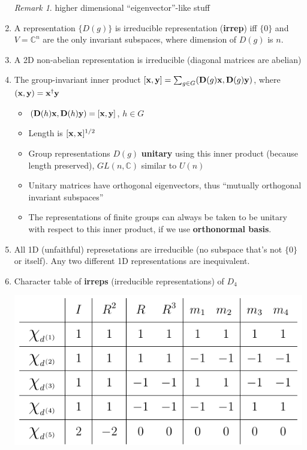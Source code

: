 \documentclass{article}
\theoremstyle{remark}
\newtheorem*{remark}{Remark}
\theoremstyle{remark}
\begin{document}
\begin{enumerate}
            \begin{remark}
                higher dimensional ``eigenvector''-like stuff
            \end{remark}
        \item A representation $\{D(g)\}$ is irreducible representation (\textbf{irrep}) iff $\{0\}$ and $V=\mathbb{C}^n$ are the only invariant subspaces, where dimension of $D(g)$ is $n$.
        \item A 2D non-abelian representation is irreducible (diagonal matrices are abelian)
        \item The group-invariant inner product $[\vb{x},\vb{y}]=\sum_{g\in G}(\vb{D}(g)\vb{x},\vb{D}(g)\vb{y})$, where $(\vb{x},\vb{y})=\vb{x}^\dagger\vb{y}$\begin{itemize}
                \item $(\vb{D}(h)\vb{x},\vb{D}(h)\vb{y})=[\vb{x},\vb{y}]$, $h\in G$
                \item Length is $[\vb{x},\vb{x}]^{1/2}$
                \item Group representations $D(g)$ \textbf{unitary} using this inner product (because length preserved), $GL(n,\mathbb{C})$ similar to $U(n)$
                \item Unitary matrices have orthogonal eigenvectors, thus ``mutually orthogonal invariant subspaces''
                \item The representations of finite groups can always be taken to be unitary with respect to this inner product, if we use \textbf{orthonormal basis}.
            \end{itemize}
        \item All 1D (unfaithful) represetations are irreducible (no subspace that's not $\{0\}$ or itself). Any two different 1D representations are inequivalent.
        \item Character table of \textbf{irreps} (irreducible representations) of $D_4$\\
            \begin{center}
                \includegraphics*[width=0.5\linewidth]{character_table D_4.png}
            \end{center}

\end{enumerate}
\end{document}

